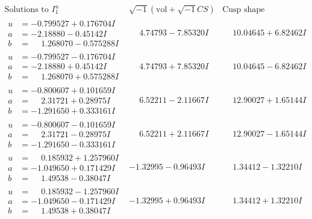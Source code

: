 \documentclass[1p]{elsarticle_modified}
\theoremstyle{definition}
\newcommand{\I}{\sqrt{-1}}
\begin{document}
$$\begin{array}{c|c|c}  
\text{Solutions to }I^u_{1}& \I (\text{vol} + \sqrt{-1}CS) & \text{Cusp shape}\\
 \hline 
\begin{aligned}
u &= -0.799527 + 0.176704 I \\
a &= -2.18880 - 0.45142 I \\
b &= \phantom{-}1.268070 - 0.575288 I\end{aligned}
 & \phantom{-}4.74793 - 7.85320 I & \phantom{-}10.04645 + 6.82462 I \\ \hline\begin{aligned}
u &= -0.799527 - 0.176704 I \\
a &= -2.18880 + 0.45142 I \\
b &= \phantom{-}1.268070 + 0.575288 I\end{aligned}
 & \phantom{-}4.74793 + 7.85320 I & \phantom{-}10.04645 - 6.82462 I \\ \hline\begin{aligned}
u &= -0.800607 + 0.101659 I \\
a &= \phantom{-}2.31721 + 0.28975 I \\
b &= -1.291650 + 0.333161 I\end{aligned}
 & \phantom{-}6.52211 - 2.11667 I & \phantom{-}12.90027 + 1.65144 I \\ \hline\begin{aligned}
u &= -0.800607 - 0.101659 I \\
a &= \phantom{-}2.31721 - 0.28975 I \\
b &= -1.291650 - 0.333161 I\end{aligned}
 & \phantom{-}6.52211 + 2.11667 I & \phantom{-}12.90027 - 1.65144 I \\ \hline\begin{aligned}
u &= \phantom{-}0.185932 + 1.257960 I \\
a &= -1.049650 + 0.171429 I \\
b &= \phantom{-}1.49538 - 0.38047 I\end{aligned}
 & -1.32995 - 0.96493 I & \phantom{-}1.34412 - 1.32210 I \\ \hline\begin{aligned}
u &= \phantom{-}0.185932 - 1.257960 I \\
a &= -1.049650 - 0.171429 I \\
b &= \phantom{-}1.49538 + 0.38047 I\end{aligned}
 & -1.32995 + 0.96493 I & \phantom{-}1.34412 + 1.32210 I \\ \hline\begin{aligned}

\end{aligned}
\end{array}$$
\end{document}
